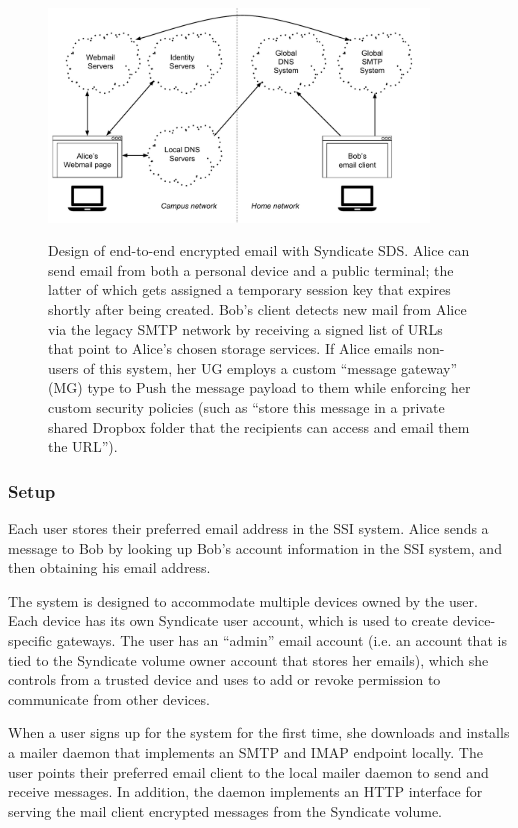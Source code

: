 \begin{figure}[h]
   \caption{Design of end-to-end encrypted email with Syndicate SDS.  Alice can
   send email from both a personal device and a public terminal; the latter of
   which gets assigned a temporary session key that expires shortly after being
   created.  Bob's client detects new mail from Alice via the legacy SMTP
   network by receiving a signed list of URLs that point to Alice's chosen
   storage services.  If Alice emails non-users of this system, her UG employs a
   custom ``message gateway'' (MG) type to Push the message payload to them
   while enforcing her custom security policies (such as ``store this message in
   a private shared Dropbox folder that the recipients can access and email them
   the URL'').}
   \centering
   \includegraphics[width=0.9\textwidth,page=24]{figures/dissertation-figures}
   \label{fig:chap4-syndicate-mail}
\end{figure}

\subsubsection{Setup}

Each user stores their preferred email address in the SSI system.
Alice sends a message to Bob by looking up Bob's account
information in the SSI system, and then obtaining his email address.

The system is designed to accommodate multiple devices owned by the user.  Each
device has its own Syndicate user account, which is used to create
device-specific gateways.  The user has an ``admin'' email account (i.e. an
account that is tied to the Syndicate volume owner account that stores her
emails), which she controls
from a trusted device and uses to add or revoke permission to communicate from
other devices.

When a user signs up for the system for the first time, she downloads and
installs a mailer daemon
that implements an SMTP and IMAP endpoint locally.  The user points their preferred email
client to the local mailer daemon to send and receive messages.  In addition,
the daemon implements an HTTP interface for serving the mail client encrypted
messages from the Syndicate volume.

